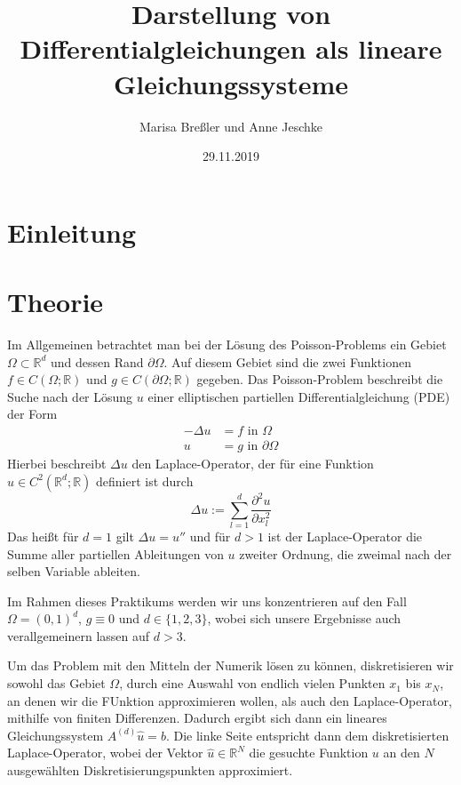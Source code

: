 \documentclass{scrartcl}
\newcommand{\R}{\mathbb{R}}
\begin{document}
\title{Darstellung von Differentialgleichungen als lineare Gleichungssysteme}
\author{Marisa Breßler und Anne Jeschke}
\date{29.11.2019}
\maketitle

\tableofcontents

\pagebreak
\section{Einleitung}

\pagebreak
\section{Theorie}
Im Allgemeinen betrachtet man bei der Lösung des Poisson-Problems ein Gebiet $\Omega\subset\R^d$ und dessen Rand $\partial\Omega$.
Auf diesem Gebiet sind die zwei Funktionen $f\in C(\Omega ; \R)$ und $g\in C(\partial\Omega ; \R)$ gegeben.
Das Poisson-Problem beschreibt die Suche nach der Lösung $u$ einer elliptischen partiellen Differentialgleichung (PDE) der Form
\[\begin{split}
-\Delta u &= f \textrm{ in } \Omega\\
        u &= g \textrm{ in } \partial\Omega
\end{split}
\]
Hierbei beschreibt $\Delta u$ den Laplace-Operator, der für eine Funktion $u\in C^2(\R^d;\R)$ definiert ist durch \[\Delta u := \sum_{l=1}^{d} \frac{\partial^2 u}{\partial x^2_l}\]
Das heißt für $d=1$ gilt $\Delta u = u''$ und für $d>1$ ist der Laplace-Operator die Summe aller partiellen Ableitungen von $u$ zweiter Ordnung, die zweimal nach der selben Variable ableiten.

Im Rahmen dieses Praktikums werden wir uns konzentrieren auf den Fall $\Omega=(0,1)^d$, $g\equiv0$ und $d\in\{1, 2, 3\}$, wobei sich unsere Ergebnisse auch verallgemeinern lassen auf $d>3$.

Um das Problem mit den Mitteln der Numerik lösen zu können, diskretisieren wir sowohl das Gebiet $\Omega$, durch eine Auswahl von endlich vielen Punkten $x_1$ bis $x_N$, an denen wir die FUnktion approximieren wollen, als auch den Laplace-Operator, mithilfe von finiten Differenzen. Dadurch ergibt sich dann ein lineares Gleichungssystem $A^{(d)}\hat{u}=b$. Die linke Seite entspricht dann dem diskretisierten Laplace-Operator, wobei der Vektor $\hat{u}\in\R^N$ die gesuchte Funktion $u$ an den $N$ ausgewählten Diskretisierungspunkten approximiert.
\end{document}
